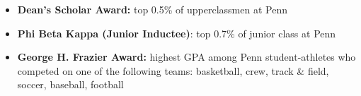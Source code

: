 \documentclass[10pt, letterpaper]{article}
\newenvironment{highlights}{
    \begin{itemize}[
        topsep=0.10 cm,
        parsep=0.10 cm,
        partopsep=0pt,
        itemsep=0pt,
        leftmargin=0.4 cm + 10pt
    ]
}{
    \end{itemize}
} %
\newenvironment{widetwocolentry}[2][]{
    \onecolentry
    \def\secondColumn{#2}
    \setcolumnwidth{\fill, 9.5 cm}
    \begin{paracol}{2}
}{
    \switchcolumn \raggedleft \secondColumn
    \end{paracol}
    \endonecolentry
} %
\begin{document}
\begin{highlights}
    \item \textbf{Dean's Scholar Award:} top 0.5\% of upperclassmen at Penn
    \item \textbf{Phi Beta Kappa (Junior Inductee)}: top 0.7\% of junior class at Penn
    \item \textbf{George H. Frazier Award:} highest GPA among Penn student-athletes who competed on one of the following teams: basketball, crew, track \& field, soccer, baseball, football
\end{highlights}



\end{document}
